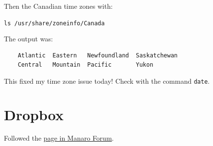 \documentclass[]{scrartcl}
\begin{document}
Then the Canadian time zones with:

\verb|ls /usr/share/zoneinfo/Canada|

The output was:

\begin{verbatim}
	Atlantic  Eastern   Newfoundland  Saskatchewan
	Central   Mountain  Pacific       Yukon
\end{verbatim}

This fixed my time zone issue today! Check with the command \texttt{date}.

\section{Dropbox}

Followed the \href{https://forum.manjaro.org/t/dropbox-install-new-to-manjaro/9576/5}{page in Manaro Forum}.
\end{document}
